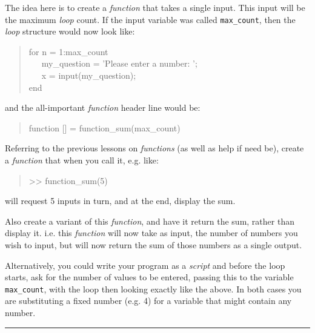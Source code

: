 \documentclass{tufte-book} %
\newenvironment{docspec}{\begin{quotation}\ttfamily\parskip0pt\parindent0pt\ignorespaces}{\end{quotation}}
\begin{document}
The idea here is to create a \textit{function} that takes a single input. This input will be the maximum \textit{loop} count. If the input variable was called \texttt{max\_count}, then the \textit{loop} structure would now look like:
\begin{docspec}
for n = 1:max\_count
\\ \ \ \ my\_question = 'Please enter a number: ';
\\ \ \ \ x = input(my\_question);
\\end
\end{docspec}
and the all-important \textit{function} header line would be:
\begin{docspec}
function [] = function\_sum(max\_count)
\end{docspec}

Referring to the previous lessons on \textit{functions} (as well as \textsf{help} if need be), create a \textit{function} that when you call it, e.g. like:
\begin{docspec}
>> function\_sum(5)
\end{docspec}
will request 5 inputs in turn, and at the end, display the sum.

Also create a variant of this \textit{function}, and have it return the sum, rather than display it. i.e. this \textit{function} will now take as input, the number of numbers you wish to input, but will now return the sum of those numbers as a single output.

Alternatively, you could write your program as a \textit{script} and before the loop starts,  ask for the number of values to be entered, passing this to the variable \texttt{max\_count}, with the loop then looking exactly like the above. In both cases you are substituting a fixed number (e.g. 4) for a variable that might contain any number.

\vspace{1mm}
\noindent\rule{4cm}{0.5pt}
\vspace{2mm}
\end{document}

